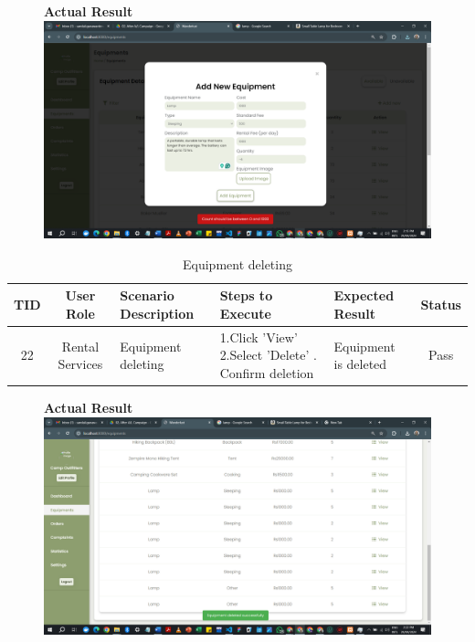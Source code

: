 \begin{figure}[h!]
    \centering
    \textbf{Actual Result}
    \includegraphics[width=1\textwidth]{Images/Test Cases/21. Invalid Equipment adding.png}
\end{figure}
\clearpage



\begin{table}[ht]
\centering
\begin{tabularx}{\textwidth}{|c|c|X|X|X|c|}
\hline
\textbf{TID} & \textbf{User Role} & \textbf{Scenario Description} & \textbf{Steps to Execute} & \textbf{Expected Result} & \textbf{Status} \\ \hline
22 & Rental Services & Equipment deleting & 1.Click 'View' \newline2.Select 'Delete' \newline3. Confirm deletion & Equipment is deleted & Pass \\ \hline
\end{tabularx}
\caption{Equipment deleting}
\end{table}

\begin{figure}[h!]
    \centering
    \textbf{Actual Result}
    \includegraphics[width=1\textwidth]{Images/Test Cases/22. Equipment deleting.png}
\end{figure}
\clearpage


